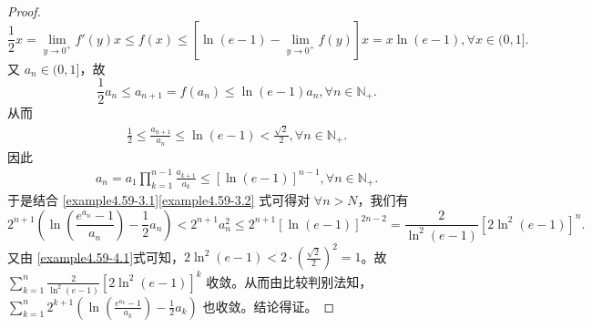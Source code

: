 \documentclass[lang=cn,newtx,10pt,scheme=chinese]{elegantbook}
\begin{document}
\begin{proof}
\[
\frac{1}{2} x = \lim_{y \to 0^+} f'(y) x \leq f(x) \leq [\ln(e - 1) - \lim_{y \to 0^+} f(y)] x = x \ln(e - 1),\forall x \in (0, 1].
\]
又 \(a_n \in (0, 1]\)，故
\[
\frac{1}{2} a_n \leq a_{n + 1} = f(a_n) \leq \ln(e - 1) a_n,\forall n \in \mathbb{N}_+.
\]
从而
\begin{align}
\frac{1}{2} \leq \frac{a_{n + 1}}{a_n} \leq \ln(e - 1) < \frac{\sqrt{2}}{2},\forall n \in \mathbb{N}_+. \label{example4.59-4.1} 
\end{align}
因此
\begin{align}
a_n = a_1 \prod_{k = 1}^{n - 1} \frac{a_{k + 1}}{a_k} \leq [\ln(e - 1)]^{n - 1},\forall n \in \mathbb{N}_+. \label{example4.59-3.2}
\end{align}
于是结合 \eqref{example4.59-3.1}\eqref{example4.59-3.2} 式可得对 \(\forall n > N\)，我们有
\[
2^{n + 1}\left(\ln\left(\frac{e^{a_n} - 1}{a_n}\right) - \frac{1}{2} a_n\right) < 2^{n + 1} a_n^2 \leq 2^{n + 1}[\ln(e - 1)]^{2n - 2} = \frac{2}{\ln^2(e - 1)}[2\ln^2(e - 1)]^n.
\]
又由 \eqref{example4.59-4.1}式可知，\(2\ln^2(e - 1) < 2\cdot\left(\frac{\sqrt{2}}{2}\right)^2 = 1\)。故 \(\sum_{k = 1}^n \frac{2}{\ln^2(e - 1)}[2\ln^2(e - 1)]^k\) 收敛。从而由比较判别法知，\(\sum_{k = 1}^n 2^{k + 1}\left(\ln\left(\frac{e^{a_k} - 1}{a_k}\right) - \frac{1}{2} a_k\right)\) 也收敛。结论得证。
\end{proof}
\end{document}
